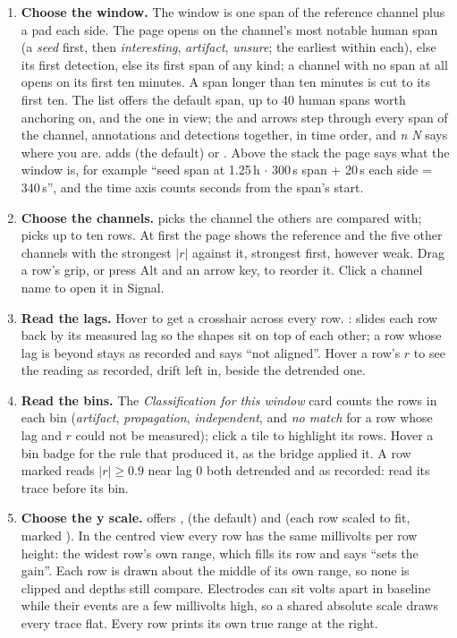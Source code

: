 \begin{enumerate}
  \item \textbf{Choose the window.} The window is one span of the reference channel plus a pad
    each side. The page opens on the channel's most notable human span (a \emph{seed} first,
    then \emph{interesting}, \emph{artifact}, \emph{unsure}; the earliest within each), else
    its first detection, else its first span of any kind; a channel with no span at all opens
    on its first ten minutes. A span longer than ten minutes is cut to
    its first ten. The  list offers the default span, up to 40 human spans worth
    anchoring on, and the one in view; the  and  arrows step through every span of
    the channel, annotations and detections together, in time order, and  \emph{n}
     \emph{N} says where you are.  adds  (the default) or
    . Above the stack the page says what the window is, for example ``seed
    span at 1.25\,h $\cdot$ 300\,s span + 20\,s each side = 340\,s'', and the time axis counts
    seconds from the span's start.
  \item \textbf{Choose the channels.}  picks the channel the others are
    compared with;  picks up to ten rows. At first the page shows the reference
    and the five other channels with the strongest $|r|$ against it, strongest first, however
    weak. Drag a row's grip, or press Alt and an arrow key, to reorder it. Click a channel
    name to open it in Signal.
  \item \textbf{Read the lags.} Hover to get a crosshair across every row. :
     slides each row back by its measured lag so the shapes sit on top of each
    other; a row whose lag is beyond  stays as recorded and says ``not aligned''.
    Hover a row's $r$ to see the reading as recorded, drift left in, beside the detrended one.
  \item \textbf{Read the bins.} The \emph{Classification for this window} card counts the
    rows in each bin (\emph{artifact}, \emph{propagation}, \emph{independent}, and \emph{no
    match} for a row whose lag and $r$ could not be measured); click a tile to highlight its
    rows. Hover a bin badge for the rule that produced it, as the bridge applied it. A row
    marked  reads $|r| \ge 0.9$ near lag 0 both detrended and as
    recorded: read its trace before its bin.
  \item \textbf{Choose the y scale.}  offers ,  (the default) and  (each row scaled to fit, marked
    ). In the centred view every row has the same millivolts per row height:
    the widest row's own range, which fills its row and says ``sets the gain''. Each row is
    drawn about the middle of its own range, so none is clipped and depths still compare.
    Electrodes can sit volts apart in baseline while their events are a few millivolts high,
    so a shared absolute scale draws every trace flat. Every row prints its own true range at
    the right.
\end{enumerate}

